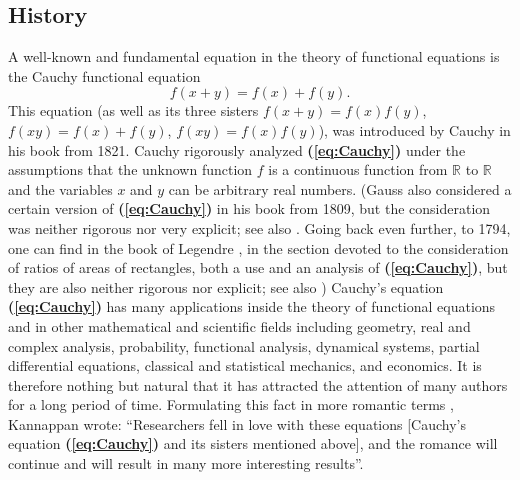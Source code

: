 \documentclass[12 pt]{amsart}
\theoremstyle{definition}
\newcommand{\R}{\mathbb{R}}
\newcommand{\beqref}[1]{\textbf{(\ref{#1})}} %
\begin{document}
\subsection{History} 
A well-known and fundamental equation in the theory of functional equations is 
the Cauchy functional equation 
\begin{equation}\label{eq:Cauchy}
f(x+y)=f(x)+f(y).
\end{equation}
This equation (as well as its three sisters $f(x+y)=f(x)f(y)$, $f(xy)=f(x)+f(y)$, $f(xy)=f(x)f(y)$), was introduced by Cauchy in his book \cite[p. 103]{Cauchy1821} from 1821.  Cauchy rigorously analyzed \beqref{eq:Cauchy}  under the assumptions that the unknown function $f$ is a continuous function from $\R$ to $\R$ and the variables $x$ and $y$ can be arbitrary real numbers. (Gauss \cite[p. 212]{Gauss1809} also considered a certain version of \beqref{eq:Cauchy} in his book from 1809, but the consideration was neither rigorous nor very explicit; see also \cite[pp. 47, 106--109]{Aczel}. Going back even further, to 1794, one can find in the book of  Legendre \cite{Legendre1794book}, in the section devoted to the consideration of ratios of areas of rectangles, both a use and an analysis of \beqref{eq:Cauchy}, but they are also neither rigorous nor explicit; see also \cite[pp. 369--370]{AczelDhombres}) Cauchy's equation \beqref{eq:Cauchy} has many applications 
inside the theory of functional equations and in other mathematical and scientific fields including geometry, real and complex analysis, probability, functional analysis, dynamical systems, partial differential equations, classical and statistical mechanics,  and economics. 
It is therefore nothing but natural that it has attracted the attention of 
many authors for a long period of time. Formulating this fact in more romantic terms \cite[p. 2]{Kannappan2009}, Kannappan wrote: ``Researchers fell in love with these equations [Cauchy's equation \beqref{eq:Cauchy} and its sisters mentioned above], and the romance will continue and will result in many more interesting results''.
\end{document}

